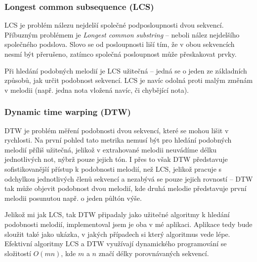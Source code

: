 \subsubsection*{Longest common subsequence (LCS)}
LCS je problém nálezu nejdelší společné podposloupnosti dvou sekvencí. Příbuzným problémem je \textit{Longest common substring} -- neboli nález nejdelšího společného podslova. Slovo se od posloupnosti liší tím, že v obou sekvencích nesmí být přerušeno, zatímco společná posloupnost může přeskakovat prvky.

Při hledání podobných melodií je LCS užitečná -- jedná se o jeden ze základních způsobů, jak určit podobnost sekvencí. LCS je navíc odolná proti malým změnám v melodii (např. jedna nota vložená navíc, či chybějící nota).

\subsubsection*{Dynamic time warping (DTW)}
DTW je problém měření podobnosti dvou sekvencí, které se mohou lišit v rychlosti. Na první pohled tato metrika nemusí být pro hledání podobných melodií příliš užitečná, jelikož v extrahované melodii neuvádíme délku jednotlivých not, nýbrž pouze jejich tón. I přes to však DTW představuje sofistikovanější přístup k podobnosti melodií, než LCS, jelikož pracuje s odchylkou jednotlivých členů sekvencí a nezabývá se pouze jejich rovností -- DTW tak může objevit podobnost dvou melodií, kde druhá melodie představuje první melodii posunutou např. o jeden půltón výše.

Jelikož mi jak LCS, tak DTW připadaly jako užitečné algoritmy k hledání podobnosti melodií, implementoval jsem je oba v mé aplikaci. Aplikace tedy bude sloužit také jako ukázka, v jakých případech si který algoritmus vede lépe. Efektivní algoritmy LCS a DTW využívají dynamického programování se složitostí $O(mn)$, kde $m$ a $n$ značí délky porovnávaných sekvencí.